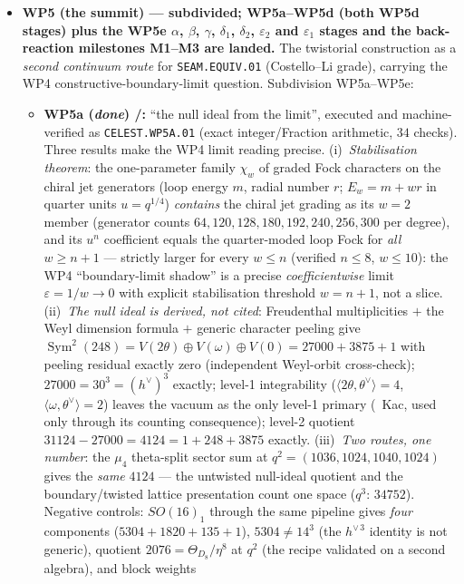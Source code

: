 \documentclass[11pt,a4paper]{article}
\begin{document}
\begin{itemize}
is fully worked off).
\item \textbf{WP5 (the summit) --- subdivided; WP5a--WP5d (both WP5d stages) plus the WP5e $\alpha$, $\beta$, $\gamma$, $\delta_1$, $\delta_2$, $\varepsilon_2$ and $\varepsilon_1$ stages and the back-reaction milestones M1--M3 are landed.} The twistorial
construction as a \emph{second continuum route} for \texttt{SEAM.EQUIV.01} (Costello--Li grade), carrying
the WP4 constructive-boundary-limit question. Subdivision WP5a--WP5e:
\begin{itemize}
\item \textbf{WP5a (\emph{done}) \mE/\mC:} ``the null ideal from the limit'', executed and
machine-verified as \texttt{CELEST.WP5A.01}  (exact
integer/Fraction arithmetic, $34$ checks). Three results make the WP4 limit reading precise.
(i)~\emph{Stabilisation theorem}: the one-parameter family $\chi_w$ of graded Fock characters on the
chiral jet generators (loop energy $m$, radial number $r$; $E_w=m+wr$ in quarter units $u=q^{1/4}$)
\emph{contains} the chiral jet grading as its $w{=}2$ member (generator counts
$64,120,128,180,192,240,256,300$ per degree), and its $u^n$ coefficient equals the quarter-moded loop
Fock for \emph{all} $w\ge n{+}1$ --- strictly larger for every $w\le n$ (verified $n\le8$, $w\le10$):
the WP4 ``boundary-limit shadow'' is a precise \emph{coefficientwise} limit $\varepsilon=1/w\to0$ with
explicit stabilisation threshold $w=n{+}1$, not a slice. (ii)~\emph{The null ideal is derived, not
cited}: Freudenthal multiplicities $+$ the Weyl dimension formula $+$ generic character peeling give
$\operatorname{Sym}^2(248)=V(2\theta)\oplus V(\omega)\oplus V(0)=27000+3875+1$ with peeling residual
exactly zero (independent Weyl-orbit cross-check); $27000=30^3=(h^\vee)^3$ exactly; level-1
integrability ($\langle2\theta,\theta^\vee\rangle=4$, $\langle\omega,\theta^\vee\rangle=2$) leaves the
vacuum as the only level-1 primary (\mC\ Kac, used only through its counting consequence); level-2
quotient $31124-27000=4124=1+248+3875$ exactly. (iii)~\emph{Two routes, one number}: the $\mu_4$
theta-split sector sum at $q^2=(1036,1024,1040,1024)$ gives the \emph{same} $4124$ --- the untwisted
null-ideal quotient and the boundary/twisted lattice presentation count one space ($q^3$: $34752$).
Negative controls: $SO(16)_1$ through the same pipeline gives \emph{four} components
($5304+1820+135+1$), $5304\neq14^3$ (the $h^{\vee\,3}$ identity is not generic), quotient
$2076=\Theta_{D_8}/\eta^8$ at $q^2$ (the recipe validated on a second algebra), and block weights

\end{itemize}
\end{itemize}
\end{document}
